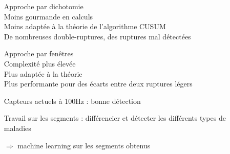 \documentclass{beamer}
\begin{document}
\begin{frame}

\begin{itemize}

	\item[Approche] par dichotomie
			\\ Moins gourmande en calculs
			\\ Moins adaptée à la théorie de l'algorithme CUSUM
			\\ De nombreuses double-ruptures, des ruptures mal détectées
	
	\item[Approche] par fenêtres
			\\ Complexité plus élevée
			\\ Plus adaptée à la théorie
			\\ Plus performante pour des écarts entre deux ruptures légers
	
	\item[Capteurs] actuels à 100Hz : bonne détection
	
	\item[Travail] sur les segments : différencier et détecter les différents types de maladies
	\item[$\Longrightarrow$] machine learning sur les segments obtenus
	\vspace*{1cm}

\end{itemize}

\end{frame}
\end{document}
